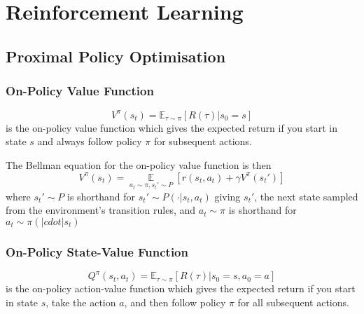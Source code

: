 \section{Reinforcement Learning}


\subsection{Proximal Policy Optimisation}

\cite{schulman_proximal_2017}

\subsubsection{On-Policy Value Function}

\begin{equation}
    V^\pi(s_t)
    =
    \mathbb{E}_{\tau\sim\pi}
    \left[R(\tau)|s_0=s\right]
\end{equation}
is the on-policy value function which gives the expected return if you start in state $s$ and always follow policy $\pi$ for subsequent actions.

The Bellman equation for the on-policy value function is then
\begin{equation}
    V^\pi(s_t)
    =
    \operatorname*{\mathbb{E}}\limits_{a_t\sim\pi,s_t'\sim{P}}
    \left[
        r(s_t, a_t) + \gamma V^\pi(s_t')
    \right]
\end{equation}
where $s_t'\sim{P}$ is shorthand for $s_t' \sim P(\cdot|s_t,a_t)$ giving $s_t'$, the next state sampled from the environment's transition rules, and $a_t\sim\pi$ is shorthand for $a_t\sim\pi(|cdot|s_t)$

\subsubsection{On-Policy State-Value Function}

\begin{equation}
    Q^\pi(s_t, a_t) = \mathbb{E}_{\tau\sim\pi}
    \left[R(\tau)|s_0=s, a_0=a\right]
\end{equation}
is the on-policy action-value function which gives the expected return if you start in state $s$, take the action $a$, and then follow policy $\pi$ for all subsequent actions.

